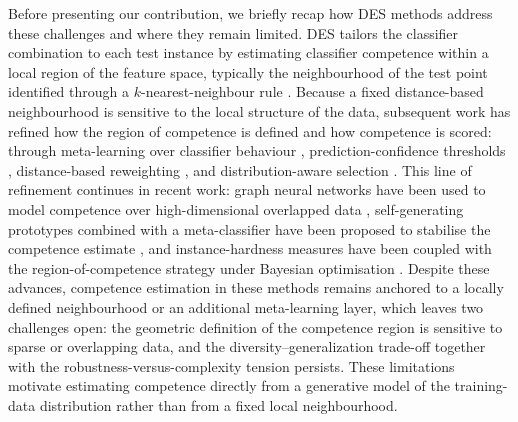 \documentclass[lettersize,journal]{IEEEtran}
\begin{document}
	Before presenting our contribution, we briefly recap how DES methods address these challenges and where they remain limited. DES tailors the classifier combination to each test instance by estimating classifier competence within a local region of the feature space, typically the neighbourhood of the test point identified through a $k$-nearest-neighbour rule \cite{ko_dynamic_2008, cruz_dynamic_2018}. Because a fixed distance-based neighbourhood is sensitive to the local structure of the data, subsequent work has refined how the region of competence is defined and how competence is scored: through meta-learning over classifier behaviour \cite{cruz_meta-oracle_2017}, prediction-confidence thresholds \cite{nguyen_ensemble_2020}, distance-based reweighting \cite{zhang_distance-based_2019}, and distribution-aware selection \cite{choi_ddes_2021}. This line of refinement continues in recent work: graph neural networks have been used to model competence over high-dimensional overlapped data \cite{souza_dynamic_2023}, self-generating prototypes combined with a meta-classifier have been proposed to stabilise the competence estimate \cite{manastarla_enhancing_2024}, and instance-hardness measures have been coupled with the region-of-competence strategy under Bayesian optimisation \cite{aziz_road_2024}. Despite these advances, competence estimation in these methods remains anchored to a locally defined neighbourhood or an additional meta-learning layer, which leaves two challenges open: the geometric definition of the competence region is sensitive to sparse or overlapping data, and the diversity--generalization trade-off \cite{lessmann_benchmarking_2015} together with the robustness-versus-complexity tension \cite{ditzler_learning_2015} persists. These limitations motivate estimating competence directly from a generative model of the training-data distribution rather than from a fixed local neighbourhood.
\end{document}

